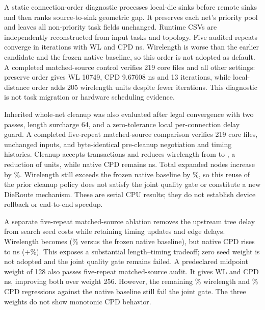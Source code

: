 \documentclass[10pt]{article}
\begin{document}
A static connection-order diagnostic processes local-die sinks before remote
sinks and then ranks source-to-sink geometric gap. It preserves each net's
priority pool and leaves all non-priority task fields unchanged. Runtime CSVs
are independently reconstructed from input tasks and topology. Five audited
repeats converge in \LocalOrderIterations{} iterations with WL
\LocalOrderWL{} and CPD \LocalOrderCPD{} ns. Wirelength is worse than the
earlier candidate and the frozen native baseline, so this order is not adopted
as default. A completed matched-source control verifies 219 core files and all
other settings: preserve order gives WL 10749, CPD 9.67608 ns and 13 iterations,
while local-distance order adds 205 wirelength units despite fewer iterations.
This diagnostic is not task migration or hardware scheduling evidence.

Inherited whole-net cleanup was also evaluated after legal convergence with
two passes, length surcharge 64, and a zero-tolerance local per-connection
delay guard. A completed five-repeat matched-source comparison verifies
219 core files, unchanged inputs, and byte-identical pre-cleanup negotiation
and timing histories. Cleanup accepts \CleanupAccepted{} transactions and
reduces wirelength from \CleanupBeforeWL{} to \CleanupWL{}, a reduction of
\CleanupWireReduction{} units, while native CPD remains \CleanupCPD{} ns.
Total expanded nodes increase by \CleanupExpandedIncrease{}\%.
Wirelength still exceeds the frozen native baseline by \CleanupWLDelta{}\%,
so this reuse of the prior cleanup policy does not satisfy the joint quality
gate or constitute a new DieRoute mechanism. These are serial CPU results;
they do not establish device rollback or end-to-end speedup.

A separate five-repeat matched-source ablation removes the upstream tree
delay from search seed costs while retaining timing updates and edge delays.
Wirelength becomes \ZeroSeedWL{} (\ZeroSeedWLDelta{}\% versus the frozen
native baseline), but native CPD rises to \ZeroSeedCPD{} ns
(+\ZeroSeedCPDDelta{}\%). This exposes a substantial length--timing tradeoff;
zero seed weight is not adopted and the joint quality gate remains failed.
A predeclared midpoint weight of 128 also passes five-repeat matched-source
audit. It gives WL \MidSeedWL{} and CPD \MidSeedCPD{} ns, improving both
over weight 256. However, the remaining \MidSeedWLDelta{}\% wirelength and
\MidSeedCPDDelta{}\% CPD regressions against the native baseline still fail
the joint gate. The three weights do not show monotonic CPD behavior.
\end{document}
